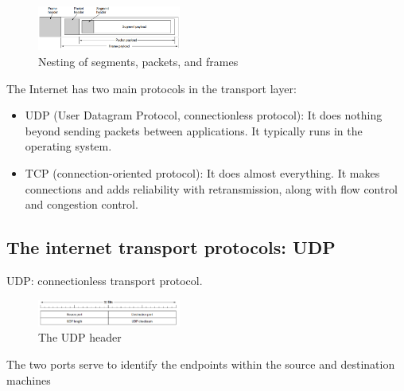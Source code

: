 \begin{figure}[!htb]
    \centering
    \includegraphics[width=0.42\textwidth]{pic/CN6/Nesting of segments, packets, and frames}
    \caption{Nesting of segments, packets, and frames}
\end{figure}

The Internet has two main protocols in the transport layer:
\begin{itemize}
    \item UDP (User Datagram Protocol, connectionless protocol): It does nothing beyond sending packets between applications. It typically runs in the operating system.
    \item TCP (connection-oriented protocol): It does almost everything. It makes connections and adds reliability with retransmission, along with flow control and congestion control.
\end{itemize}

\subsection{The internet transport protocols: UDP}
UDP: connectionless transport protocol. 

\begin{figure}[!htb]
    \centering
    \includegraphics[width=0.42\textwidth]{pic/CN6/The UDP header}
    \caption{The UDP header}
\end{figure}

The two ports serve to identify the endpoints within the source and destination machines

